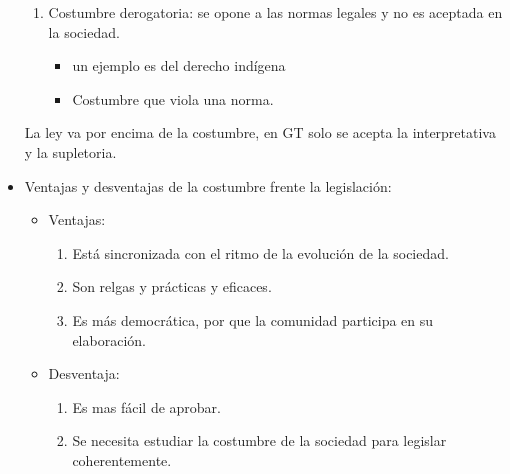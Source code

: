 \begin{itemize}
\begin{enumerate}
        \item Costumbre derogatoria: se opone a las normas legales y no es aceptada en la sociedad.
            \begin{itemize}
                \item un ejemplo es del derecho indígena 
                \item Costumbre que viola una norma.
            \end{itemize}
    \end{enumerate}
    La ley va por encima de la costumbre, en GT solo se acepta la interpretativa y la supletoria.
    
    \item Ventajas y desventajas de la costumbre frente la legislación:
    \begin{itemize}
        \item Ventajas:
            \begin{enumerate}
                \item Está sincronizada con el ritmo de la evolución de la sociedad.
                \item Son relgas y prácticas y eficaces.
                \item Es más democrática, por que la comunidad participa en su elaboración.
            \end{enumerate}
        
        \item Desventaja:
            \begin{enumerate}
                \item Es mas fácil de aprobar.
                \item Se necesita estudiar la costumbre de la sociedad para legislar coherentemente.
            \end{enumerate}
    \end{itemize}
\end{itemize}

